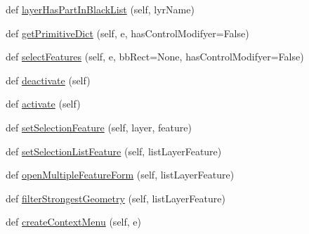 \begin{DoxyCompactItemize}
def \mbox{\hyperlink{class_dsg_tools_1_1_production_tools_1_1_copy_paste_tool_1_1multi_layer_select_1_1_multi_layer_selection_a70d66faf08affdbc098675d3226aed5b}{layer\+Has\+Part\+In\+Black\+List}} (self, lyr\+Name)
\item 
def \mbox{\hyperlink{class_dsg_tools_1_1_production_tools_1_1_copy_paste_tool_1_1multi_layer_select_1_1_multi_layer_selection_ae6eafe6bd1b2ee8c71bd043da057be57}{get\+Primitive\+Dict}} (self, e, has\+Control\+Modifyer=False)
\item 
def \mbox{\hyperlink{class_dsg_tools_1_1_production_tools_1_1_copy_paste_tool_1_1multi_layer_select_1_1_multi_layer_selection_a506db45cb8c41343be46a89578a9d59b}{select\+Features}} (self, e, bb\+Rect=None, has\+Control\+Modifyer=False)
\item 
def \mbox{\hyperlink{class_dsg_tools_1_1_production_tools_1_1_copy_paste_tool_1_1multi_layer_select_1_1_multi_layer_selection_a51e315b9dd7609f9a5d277377071098b}{deactivate}} (self)
\item 
def \mbox{\hyperlink{class_dsg_tools_1_1_production_tools_1_1_copy_paste_tool_1_1multi_layer_select_1_1_multi_layer_selection_a907b8aeeb7197817b2adddf3f7212bf5}{activate}} (self)
\item 
def \mbox{\hyperlink{class_dsg_tools_1_1_production_tools_1_1_copy_paste_tool_1_1multi_layer_select_1_1_multi_layer_selection_a5247c0f55a8d4225bf8db316331a4406}{set\+Selection\+Feature}} (self, layer, feature)
\item 
def \mbox{\hyperlink{class_dsg_tools_1_1_production_tools_1_1_copy_paste_tool_1_1multi_layer_select_1_1_multi_layer_selection_a98ef566da0b3d8a1ac39d63bde80dd3b}{set\+Selection\+List\+Feature}} (self, list\+Layer\+Feature)
\item 
def \mbox{\hyperlink{class_dsg_tools_1_1_production_tools_1_1_copy_paste_tool_1_1multi_layer_select_1_1_multi_layer_selection_a6508f006e6f74fb040286a58d845f774}{open\+Multiple\+Feature\+Form}} (self, list\+Layer\+Feature)
\item 
def \mbox{\hyperlink{class_dsg_tools_1_1_production_tools_1_1_copy_paste_tool_1_1multi_layer_select_1_1_multi_layer_selection_a15df3430dbf930ba31e2eadd1f8f2048}{filter\+Strongest\+Geometry}} (self, list\+Layer\+Feature)
\item 
def \mbox{\hyperlink{class_dsg_tools_1_1_production_tools_1_1_copy_paste_tool_1_1multi_layer_select_1_1_multi_layer_selection_aef32a3f7fc1278b8cc1716c608781d69}{create\+Context\+Menu}} (self, e)
\end{DoxyCompactItemize}
